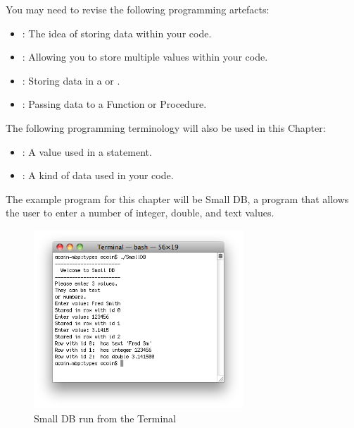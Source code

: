 \bigskip

You may need to revise the following programming artefacts:
\begin{itemize}
  \item {}: The idea of storing data within your code.
  \item {}: Allowing you to store multiple values within your code.
  \item {}: Storing data in a  or .
  \item {}: Passing data to a Function or Procedure.
\end{itemize}

The following programming terminology will also be used in this Chapter:
\begin{itemize}
  \item {}: A value used in a statement.
  \item {}: A kind of data used in your code.
\end{itemize}

The example program for this chapter will be Small DB, a program that allows the user to enter a number of integer, double, and text values.

\begin{figure}[h]
   \centering
   \includegraphics[width=0.7\textwidth]{./topics/type-decl/images/SmallDB} 
   \caption{Small DB run from the Terminal}
   \label{fig:small-db}
\end{figure}









